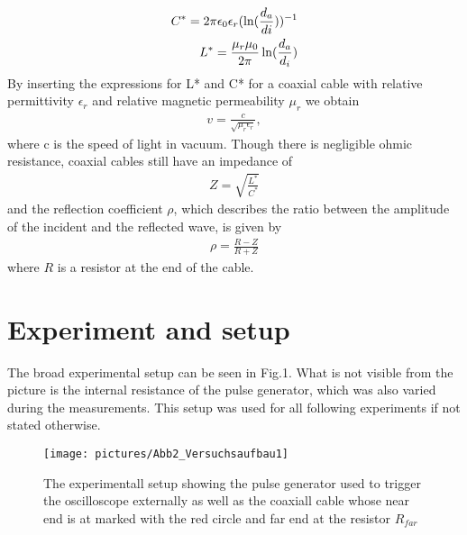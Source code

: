 \documentclass[a4paper,10pt,twocolumn]{article}
\begin{document}
    \begin{align}
        C^* = 2\pi\epsilon_0\epsilon_r (\ln(\frac{d_a}{di}))^{-1}\endline
        L^* = \frac{\mu_r\mu_0}{2\pi}\ln(\frac{d_a}{d_i})
        \end{align}
    By inserting the expressions for L* and C* for a coaxial cable with relative permittivity $\epsilon_r$ and relative magnetic permeability $\mu_r$ we obtain
    \begin{align}
        \label{eq:vavePropagationVelocity}
        v = \frac{c}{\sqrt{\mu_r\epsilon_r}},
    \end{align}
    where c is the speed of light in vacuum.
    Though there is negligible ohmic resistance, coaxial cables still have an impedance of
    \begin{align}
        Z=\sqrt{\frac{L^*}{C^*}}
    \end{align}
    and the reflection coefficient $\rho$, which describes the ratio between the amplitude of the incident and the reflected wave, is given by
    \begin{align}
        \label{eq:coaxRef}
        \rho=\frac{R-Z}{R+Z}
    \end{align}
    where $R$ is a resistor at the end of the cable.
    \section{Experiment and setup}
    The broad experimental setup can be seen in Fig.1. What is not visible from the picture is the internal resistance of the pulse generator, which was also varied during the measurements.
    This setup was used for all following experiments if not stated otherwise.
    \begin{figure}[htbp]                                 %
        \begin{center}                                       %
            \texttt{[image: pictures/Abb2\_Versuchsaufbau1]}      %
            \caption[]{The experimentall setup showing the pulse generator used to trigger the oscilloscope externally as well as the coaxiall cable whose near end is at marked with the red circle and far end at the resistor $R_{far}$}   %
            \label{fig:Aufbau}                                      %
        \end{center}
    \end{figure}
\end{document}
